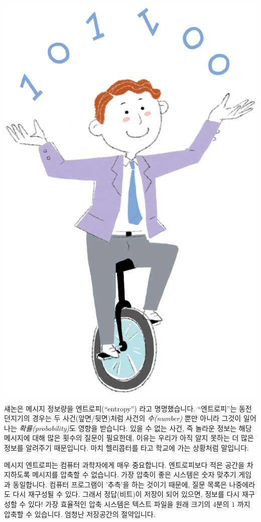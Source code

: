 \documentclass[]{article}
\begin{document}
\includegraphics{csunplugged/01-part/img/ch05-info/05-info-03-shannon.png}

섀논은 메시지 정보량을 엔트로피(``entropy'') 라고 명명했습니다.
``엔트로피''는 동전 던지기의 경우는 두 사건(앞면/뒷면)처럼 사건의
\emph{수(number)} 뿐만 아니라 그것이 일어나는 \emph{확률(probability)}도
영향을 받습니다. 있을 수 없는 사건, 즉 놀라운 정보는 해당 메시지에 대해
많은 횟수의 질문이 필요한데, 이유는 우리가 아직 알지 못하는 더 많은
정보를 알려주기 때문입니다. 마치 헬리콥터를 타고 학교에 가는 상황처럼
말입니다.

메시지 엔트로피는 컴퓨터 과학자에게 매우 중요합니다. 엔트로피보다 적은
공간을 차지하도록 메시지를 압축할 수 없습니다. 가장 압축이 좋은 시스템은
숫자 맞추기 게임과 동일합니다. 컴퓨터 프로그램이 '추측'을 하는 것이기
때문에, 질문 목록은 나중에라도 다시 재구성될 수 있다. 그래서
정답(비트)이 저장이 되어 있으면, 정보를 다시 재구성할 수 있다! 가장
효율적인 압축 시스템은 텍스트 파일을 원래 크기의 4분의 1 까지 압축할 수
있습니다. 엄청난 저장공간의 절약입니다.
\end{document}
